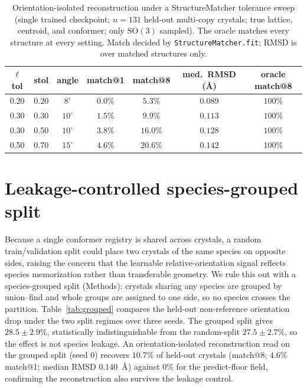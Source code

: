 \documentclass[11pt]{article}
\begin{document}
\begin{table}[h]
\centering
\caption{Orientation-isolated reconstruction under a StructureMatcher tolerance
sweep (single trained checkpoint; $n=131$ held-out multi-copy crystals; true
lattice, centroid, and conformer; only $\mathrm{SO}(3)$ sampled). The oracle
matches every structure at every setting. Match decided by
\texttt{StructureMatcher.fit}; RMSD is over matched structures only.}
\label{tab:sweep}
\begin{tabular}{ccccccc}
\toprule
$\ell$tol & stol & angle & match@1 & match@8 & med.\ RMSD (\AA) & oracle match@8 \\
\midrule
0.20 & 0.20 & $8^\circ$  & $0.0\%$ & $5.3\%$  & $0.089$ & $100\%$ \\
0.30 & 0.30 & $10^\circ$ & $1.5\%$ & $9.9\%$  & $0.113$ & $100\%$ \\
0.30 & 0.50 & $10^\circ$ & $3.8\%$ & $16.0\%$ & $0.128$ & $100\%$ \\
0.50 & 0.70 & $15^\circ$ & $4.6\%$ & $20.6\%$ & $0.142$ & $100\%$ \\
\bottomrule
\end{tabular}
\end{table}

\section{Leakage-controlled species-grouped split}

Because a single conformer registry is shared across crystals, a random
train/validation split could place two crystals of the same species on opposite
sides, raising the concern that the learnable relative-orientation signal reflects
species memorization rather than transferable geometry. We rule this out with a
species-grouped split (Methods): crystals sharing any species are grouped by
union--find and whole groups are assigned to one side, so no species crosses the
partition. Table~\ref{tab:grouped} compares the held-out non-reference
orientation drop under the two split regimes over three seeds. The grouped split
gives $28.5\pm2.9\%$, statistically indistinguishable from the random-split
$27.5\pm2.7\%$, so the effect is not species leakage. An orientation-isolated
reconstruction read on the grouped split (seed 0) recovers $10.7\%$ of held-out
crystals (match@8; $4.6\%$ match@1; median RMSD $0.140$~\AA) against $0\%$ for the
predict-floor field, confirming the reconstruction also survives the leakage
control.
\end{document}
